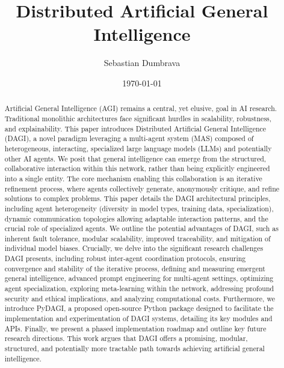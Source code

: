 \documentclass[12pt]{amsart}
\title{Distributed Artificial General Intelligence} %
\author{Sebastian Dumbrava}
\date{\today} %
\begin{document}
\maketitle

\begin{abstract}
Artificial General Intelligence (AGI) remains a central, yet elusive, goal in AI research. Traditional monolithic architectures face significant hurdles in scalability, robustness, and explainability. This paper introduces Distributed Artificial General Intelligence (DAGI), a novel paradigm leveraging a multi-agent system (MAS) composed of heterogeneous, interacting, specialized large language models (LLMs) and potentially other AI agents. We posit that general intelligence can emerge from the structured, collaborative interaction within this network, rather than being explicitly engineered into a single entity. The core mechanism enabling this collaboration is an iterative refinement process, where agents collectively generate, anonymously critique, and refine solutions to complex problems. This paper details the DAGI architectural principles, including agent heterogeneity (diversity in model types, training data, specialization), dynamic communication topologies allowing adaptable interaction patterns, and the crucial role of specialized agents. We outline the potential advantages of DAGI, such as inherent fault tolerance, modular scalability, improved traceability, and mitigation of individual model biases. Crucially, we delve into the significant research challenges DAGI presents, including robust inter-agent coordination protocols, ensuring convergence and stability of the iterative process, defining and measuring emergent general intelligence, advanced prompt engineering for multi-agent settings, optimizing agent specialization, exploring meta-learning within the network, addressing profound security and ethical implications, and analyzing computational costs. Furthermore, we introduce PyDAGI, a proposed open-source Python package designed to facilitate the implementation and experimentation of DAGI systems, detailing its key modules and APIs. Finally, we present a phased implementation roadmap and outline key future research directions. This work argues that DAGI offers a promising, modular, structured, and potentially more tractable path towards achieving artificial general intelligence.
\end{abstract}

\tableofcontents
\newpage
\end{document}
